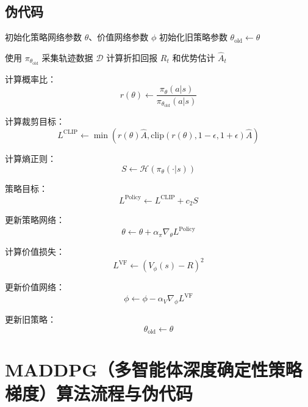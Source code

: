 \documentclass[UTF8]{ctexart}
\begin{document}
\subsection*{伪代码}

\begin{algorithm}[H]
\caption{PPO-Clip 算法（Actor-Critic 版本）}
\begin{algorithmic}[1]
\State 初始化策略网络参数 $\theta$、价值网络参数 $\phi$
\State 初始化旧策略参数 $\theta_{\text{old}}\gets\theta$

    \State 使用 $\pi_{\theta_{\text{old}}}$ 采集轨迹数据 $\mathcal{D}$
    \State 计算折扣回报 $R_t$ 和优势估计 $\hat{A}_t$
    
            \State 计算概率比：
            \[
            r(\theta)
            \gets
            \frac{\pi_{\theta}(a|s)}
            {\pi_{\theta_{\text{old}}}(a|s)}
            \]
            
            \State 计算裁剪目标：
            \[
            L^{\text{CLIP}}
            \gets
            \min
            \left(
            r(\theta)\hat{A},
            \text{clip}(r(\theta),1-\epsilon,1+\epsilon)\hat{A}
            \right)
            \]
            
            \State 计算熵正则：
            \[
            S\gets\mathcal{H}(\pi_{\theta}(\cdot|s))
            \]
            
            \State 策略目标：
            \[
            L^{\text{Policy}}\gets L^{\text{CLIP}}+c_2S
            \]
            
            \State 更新策略网络：
            \[
            \theta\gets\theta+\alpha_{\pi}\nabla_{\theta}L^{\text{Policy}}
            \]
            
            \State 计算价值损失：
            \[
            L^{\text{VF}}
            \gets
            \left(
            V_{\phi}(s)-R
            \right)^2
            \]
            
            \State 更新价值网络：
            \[
            \phi\gets\phi-\alpha_V\nabla_{\phi}L^{\text{VF}}
            \]
        \EndFor
    \EndFor
    
    \State 更新旧策略：
    \[
    \theta_{\text{old}}\gets\theta
    \]
\EndFor
\end{algorithmic}
\end{algorithm}
\newpage
\section{MADDPG（多智能体深度确定性策略梯度）算法流程与伪代码}
\end{document}
